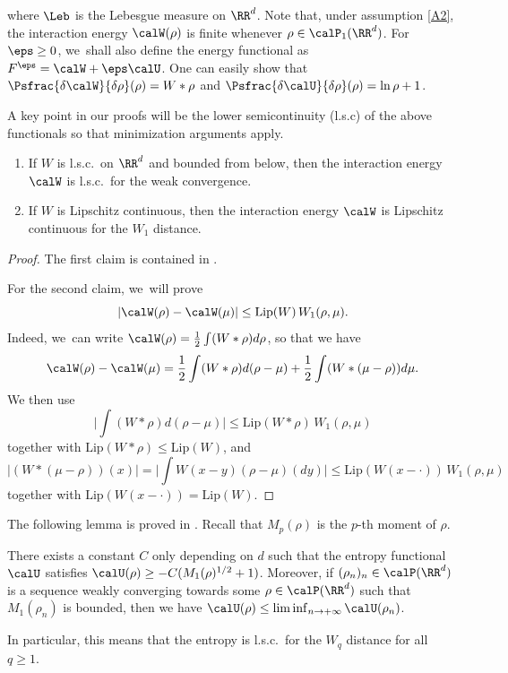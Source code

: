 where $\Leb$ is the Lebesgue measure on $\RR^d$. Note that, under assumption \eqref{A2}, the interaction energy $\calW(\rho)$ is finite whenever $\rho \in \calP_1(\RR^d)$. For $\eps \geq 0$, we~shall also define the energy functional as $F^\eps = \calW + \eps \calU$. One can easily show that $\Psfrac{\delta \calW}{\delta \rho}(\rho) = W * \rho$ and $\Psfrac{\delta \calU}{\delta \rho}(\rho) = \ln \rho + 1$.

A key point in our proofs will be the lower semicontinuity (l.s.c) of the above functionals so that minimization arguments apply.

\skpt
\begin{lemma}\label{lemma:W_lsc}
\begin{enumerate}
\item If $W$ is l.s.c.\ on $\RR^d$ and bounded from below, then the interaction energy $\calW$ is l.s.c.\ for the weak convergence.
\item If $W$ is Lipschitz continuous, then the interaction energy $\calW$ is Lipschitz continuous for the $W_1$ distance.
\end{enumerate}
\end{lemma}
\begin{proof}
The first claim is contained in \cite[Prop.\,7.2]{otam15}.

For the second claim, we~will prove
\[
|\calW(\rho)-\calW(\mu)|\leq \mathrm{Lip}(W)\,W_1(\rho,\mu).
\]
Indeed, we~can write $\calW(\rho)=\frac12 \int (W*\rho)d\rho$, so that we have
\[
\calW(\rho)-\calW(\mu)=\frac12 \int(W*\rho)d(\rho-\mu)+\frac12\int(W*(\mu-\rho))d\mu.
\]
We then use
\[
\biggl|\int(W*\rho)d(\rho-\mu)\biggr|\leq\mathrm{Lip}(W*\rho)\,W_1(\rho,\mu)
\]
together with $\mathrm{Lip}(W*\rho)\leq \mathrm{Lip}(W)$, and
\[
|(W*(\mu-\rho))(x)|=\biggl|\int W(x-y)(\rho-\mu)(dy)\biggr|\leq \mathrm{Lip}(W(x-\cdot))\,W_1(\rho,\mu)
\]
together with $\mathrm{Lip}(W(x-\cdot))=\mathrm{Lip}(W)$.
\end{proof}

The following lemma is proved in \cite[Prop.\,2.1]{moment}. Recall that $M_p(\rho)$ is the $p$-th moment of $\rho$.
\begin{lemma}\label{lemma:U_lsc}
There exists a constant $C$ only depending on $d$ such that the entropy functional $\calU$ satisfies $\calU(\rho)\geq -C(M_1(\rho)^{1/2}+1)$. Moreover, if
$(\rho_n)_n \in \calP(\RR^d)$ is a sequence weakly converging towards some $\rho \in \calP(\RR^d)$ such that $M_1(\rho_n)$ is bounded, then we have $\calU(\rho) \leq \liminf_{n \to +\infty} \calU(\rho_n)$.

In particular, this means that the entropy is l.s.c.\ for the $W_q$ distance for all $q \geq 1$.
\end{lemma}

